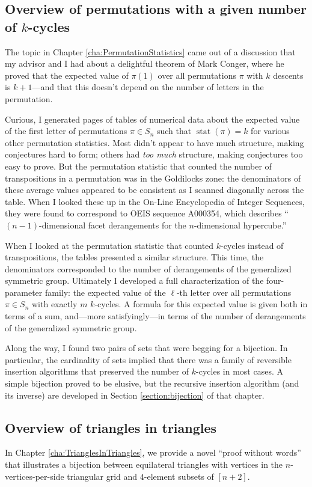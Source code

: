 \subsection{Overview of permutations with a given number of \texorpdfstring{$k$}{k}-cycles}
The topic in Chapter \ref{cha:PermutationStatistics}
came out of a discussion that my advisor and I had about a delightful
theorem of Mark Conger, where he proved that the expected value of $\pi(1)$
over all permutations $\pi$ with $k$ descents is $k + 1$---and that this doesn't
depend on the number of letters in the permutation.

Curious, I generated pages of tables of numerical data about the expected value
of the first letter of permutations $\pi \in S_n$ such that
$\operatorname{stat}(\pi) = k$ for various other permutation statistics.
Most didn't appear to have much structure, making conjectures hard to form;
others had \textit{too much} structure, making conjectures too easy to
prove.
But the permutation statistic that counted the number of transpositions in a
permutation was in the Goldilocks zone: the denominators of these average
values appeared to be consistent as I scanned diagonally across the table.
When I looked these up in the On-Line Encyclopedia of Integer Sequences,
they were found to correspond to OEIS sequence A000354, which describes
``$(n-1)$-dimensional facet derangements for the $n$-dimensional hypercube.''

When I looked at the permutation statistic that counted $k$-cycles instead of
transpositions, the tables presented a similar structure. This time, the
denominators corresponded to the number of derangements of the generalized
symmetric group. Ultimately I developed a full characterization of the
four-parameter family: the expected value of the $\ell$-th letter over all
permutations $\pi \in S_n$ with exactly $m$ $k$-cycles.
A formula for this expected value is given both in terms of a sum,
and---more satisfyingly---in terms of the number of derangements of the
 generalized symmetric group.

Along the way, I found two pairs of sets that were begging for a bijection.
In particular, the cardinality of sets implied that there was a
family of reversible insertion algorithms that preserved the number of
$k$-cycles in most cases. A simple bijection proved to be elusive, but
the recursive insertion algorithm (and its inverse) are developed in
Section \ref{section:bijection} of that chapter.

\subsection{Overview of triangles in triangles}
In Chapter \ref{cha:TrianglesInTriangles}, we provide a novel
``proof without words'' that illustrates a bijection between
equilateral triangles with vertices in the $n$-vertices-per-side
triangular grid and $4$-element subsets of $[n + 2]$.

